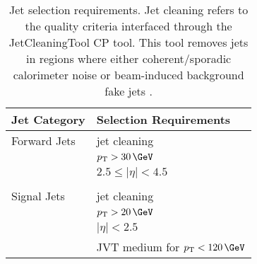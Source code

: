 \begin{table}
  \centering
  \begin{tabular}{l l}
    \toprule
   Jet Category & Selection Requirements \\
    \midrule
    Forward Jets & jet cleaning \\
    & $p_{\mathrm{T}} > 30\,\mathrm{\GeV}$ \\
    & $2.5 \leq \left|\eta\right| < 4.5$ \\ 
    &\\
    Signal Jets & jet cleaning \\
    & $p_{\mathrm{T}} > 20\,\mathrm{\GeV}$ \\
    & $ \left|\eta\right| < 2.5$ \\ 
    & JVT medium for $p_{\mathrm{T}} < 120\,\mathrm{\GeV}$ \\
    \bottomrule
  \end{tabular}
  \caption{Jet selection requirements. Jet cleaning refers to the quality
    criteria interfaced through the JetCleaningTool CP tool. This tool removes
    jets in regions where either coherent/sporadic calorimeter noise or
    beam-induced background fake jets
    \cite{ATLAS-CONF-2015-029,Gonski:2272136}.}
  
  \label{tab:jet-cats}
\end{table}